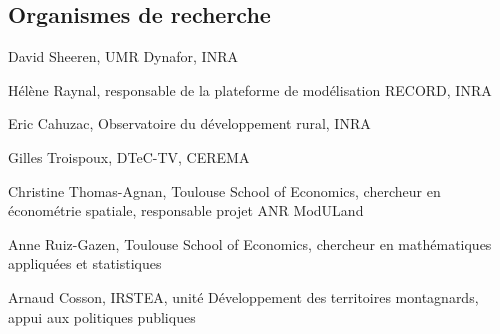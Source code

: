 \subsection{Organismes de recherche}

\startitemize[5,packed]
\item David Sheeren, UMR Dynafor, INRA
\item Hélène Raynal, responsable de la plateforme de modélisation RECORD, INRA
\item Eric Cahuzac, Observatoire du développement rural, INRA
\item Gilles Troispoux, DTeC-TV, CEREMA
\item Christine Thomas-Agnan, Toulouse School of Economics,
	chercheur en économétrie spatiale, responsable projet ANR ModULand
\item Anne Ruiz-Gazen, Toulouse School of Economics,
	chercheur en mathématiques appliquées et statistiques
\item Arnaud Cosson, IRSTEA, unité Développement des territoires montagnards,
	appui aux politiques publiques
\stopitemize
